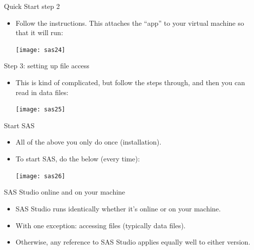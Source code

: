 \documentclass[unknownkeysallowed]{beamer}\usepackage[]{graphicx}\usepackage[]{color}
\begin{document}
\begin{frame}[fragile]{Quick Start step 2}
  
  \begin{itemize}
  \item Follow the instructions. This attaches the ``app'' to your
    virtual machine so that it will run:
    
    \texttt{[image: sas24]}
  \end{itemize}
  
\end{frame}

\begin{frame}[fragile]{Step 3: setting up file access}
  
  \begin{itemize}
  \item This is kind of complicated, but follow the steps through, and
    then you can read in data files:
    
    \texttt{[image: sas25]}
  \end{itemize}
  
\end{frame}

\begin{frame}[fragile]{Start SAS}
  
  \begin{itemize}
  \item All of the above you only do once (installation).
  \item To start SAS, do the below (every time):
    
    \texttt{[image: sas26]}
  \end{itemize}
  
\end{frame}


\begin{frame}[fragile]{SAS Studio online and on your machine}

  \begin{itemize}
  \item SAS Studio runs identically whether it's online or on your machine.
  \item With one exception: accessing files (typically data files).
  \item Otherwise, any reference to SAS Studio applies equally well to
    either version.
  \end{itemize}
  
\end{frame}
\end{document}

